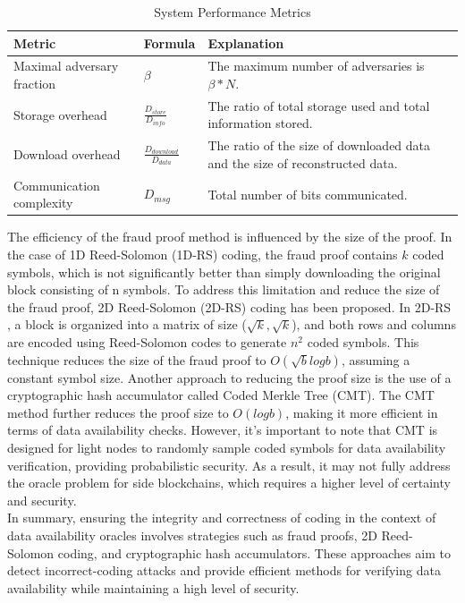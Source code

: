 \begin{table}[htbp]
	\centering
	\captionsetup{justification=centering}
	\caption[position=above]{System Performance Metrics}
	\begin{tabular}{|>{\centering\arraybackslash}p{4cm}|>{\centering\arraybackslash}p{4cm}|>{\centering\arraybackslash}p{4cm}|}
		\hline
		\textbf{Metric} & \textbf{Formula} & \textbf{Explanation}\\
		\hline
		Maximal adversary fraction & $\beta$ & The maximum number of adversaries is $\beta * N$. \\
		\hline
		Storage overhead & $\frac{D_{store}}{D_{info}}$ & The ratio of total storage used and total information stored.\\
		\hline
		Download overhead & $\frac{D_{download}}{D_{data}}$ & The ratio of the size of downloaded data and the size of reconstructed data. \\
		\hline
		Communication complexity & $D_{msg}$ & Total number of bits communicated.\\
		\hline
	\end{tabular}
\end{table}
The efficiency of the fraud proof method is influenced by the size of the proof. In the case of 1D Reed-Solomon (1D-RS) coding, the fraud proof contains $k$ coded symbols, which is not significantly better than simply downloading the original block consisting of n symbols. To address this limitation and reduce the size of the fraud proof, 2D Reed-Solomon (2D-RS) coding has been proposed. In 2D-RS \cite{reference1}, a block is organized into a matrix of size ($\sqrt{k}, \sqrt{k}$), and both rows and columns are encoded using Reed-Solomon codes to generate $n^{2}$ coded symbols. This technique reduces the size of the fraud proof to $O(\sqrt{b}logb)$, assuming a constant symbol size.
Another approach to reducing the proof size is the use of a cryptographic hash accumulator called Coded Merkle Tree (CMT)\cite{reference4}. The CMT method further reduces the proof size to $O(logb)$, making it more efficient in terms of data availability checks. However, it's important to note that CMT is designed for light nodes to randomly sample coded symbols for data availability verification, providing probabilistic security. As a result, it may not fully address the oracle problem for side blockchains, which requires a higher level of certainty and security.\\
In summary, ensuring the integrity and correctness of coding in the context of data availability oracles involves strategies such as fraud proofs, 2D Reed-Solomon coding, and cryptographic hash accumulators. These approaches aim to detect incorrect-coding attacks and provide efficient methods for verifying data availability while maintaining a high level of security.
